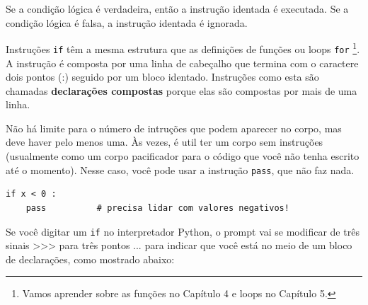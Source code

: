 Se a condição lógica é verdadeira, então a instrução
identada é executada. Se a condição lógica é
falsa, a instrução identada é ignorada.



Instruções {\tt if} têm a mesma estrutura que as definições de funções
ou loops {\tt for} \footnote{Vamos aprender sobre as funções no Capítulo 4
e loops no Capítulo 5.}. A instrução é composta por uma linha de cabeçalho
que termina com o caractere dois pontos (:)
seguido por um bloco identado. Instruções como esta são
chamadas {\bf declarações compostas} porque elas são compostas
por mais de uma linha.


Não há limite para o número de intruções que podem aparecer 
no corpo, mas deve haver pelo menos uma.
Às vezes, é util ter um corpo sem instruções (usualmente
como um corpo pacificador para o código que você não tenha escrito até o momento). Nesse
caso, você pode usar a instrução {\tt pass}, que não faz nada.



\beforeverb
\begin{verbatim}
if x < 0 :
    pass          # precisa lidar com valores negativos!
\end{verbatim}
\afterverb
%
Se você digitar um {\tt if} no interpretador Python, o prompt vai se modificar
de três sinais >>> para três pontos ... para indicar que você está no meio de um bloco de
declarações, como mostrado abaixo:

